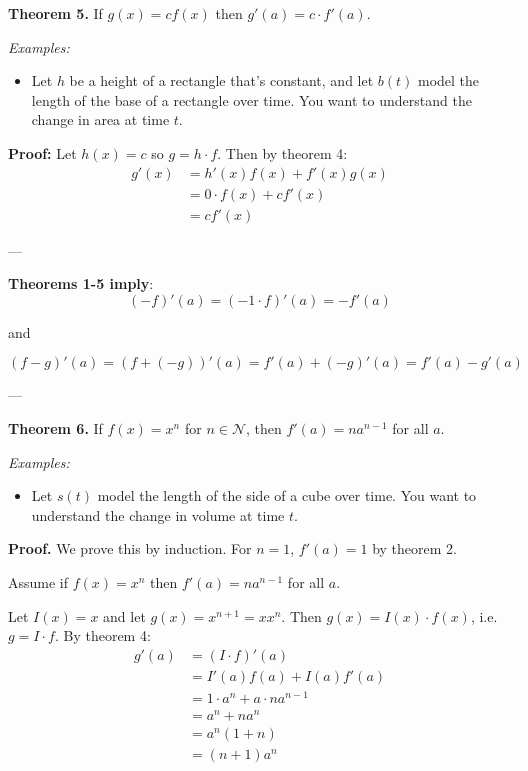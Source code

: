 \textbf{Theorem 5.} If $g(x)=cf(x)$ then $g'(a)=c\cdot f'(a)$.

\vs

\textit{Examples:}
\begin{itemize}
\item Let $h$ be a height of a rectangle that's constant, and let
  $b(t)$ model the length of the base of a rectangle over time. You
  want to understand the change in area at time $t$.
\end{itemize}

\textbf{Proof:} Let $h(x)=c$ so $g=h\cdot f$. Then by theorem 4:
\begin{align*}
  g'(x)&=h'(x)f(x)+f'(x)g(x)\\
       &=0\cdot f(x)+cf'(x)\\
       &=cf'(x)
\end{align*}

---\vs

\textbf{Theorems 1-5 imply}:
\[(-f)'(a)=(-1\cdot f)'(a)=-f'(a)\]
\begin{center}and\end{center}
\[(f-g)'(a)=(f+(-g))'(a)=f'(a)+(-g)'(a)=f'(a)-g'(a)\]

---\vs

\textbf{Theorem 6.} If $f(x)=x^n$ for $n\in\mathcal{N}$, then $f'(a)=na^{n-1}$ for
all $a$.

\vs

\textit{Examples:}
\begin{itemize}
\item Let $s(t)$ model the length of the side of a cube over time. You
  want to understand the change in volume at time $t$.
\end{itemize}

\textbf{Proof.} We prove this by induction. For $n=1$, $f'(a)=1$ by
theorem 2.

\vs

Assume if $f(x)=x^n$ then $f'(a)=na^{n-1}$ for all $a$.

\vs

Let $I(x)=x$ and let $g(x)=x^{n+1}=xx^n$. Then $g(x)=I(x)\cdot f(x)$, i.e.
$g=I\cdot f$. By theorem 4:
\begin{align*}
  g'(a)&=(I\cdot f)'(a)\\
       &=I'(a)f(a)+I(a)f'(a)\\
       &=1\cdot a^n+a\cdot na^{n-1}\\
       &=a^n+na^n\\
       &=a^n(1+n)\\
       &=(n+1)a^n
\end{align*}

